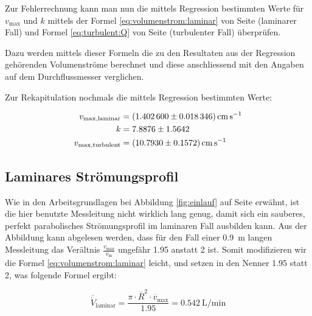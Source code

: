 Zur Fehlerrechnung kann man nun  die mittels Regression bestimmten Werte f\"ur
$v_{\mathrm{max}}$  und $k$  mittels der  Formel \ref{eq:volumenstrom:laminar}
von  Seite  \pageref{eq:volumenstrom:laminar}   (laminarer  Fall)  und  Formel
\ref{eq:turbulent:Q}  von  Seite \pageref{eq:turbulent:Q}  (turbulenter  Fall)
\"uberpr\"ufen.

Dazu werden  mittels dieser Formeln die  zu den Resultaten aus  der Regression
geh\"orenden Volumenstr\"ome berechnet und diese anschliessend mit den Angaben
auf dem Durchflussmesser verglichen.

Zur Rekapitulation nochmals die mittels Regression bestimmten Werte:

\begin{align}
    \label{eq:profile:laminar:regression:results:vmax:rekap}
    v_{\mathrm{max, laminar}} &= \SI{1.4026 \pm 0.018346}{\centi\meter\per\second}
    \\
    \label{eq:profile:turb:regression:results:k:rekap}
    k &= 7.8876 \pm 1.5642
    \\
    \label{eq:profile:turb:regression:results:vmax:rekap}
    v_{\mathrm{max, turbulent}} &= \SI{10.793 \pm 0.1572}{\centi\meter\per\second}
\end{align}

\subsection{Laminares Str\"omungsprofil}
\label{subsec:error:laminar}

Wie  in  den  Arbeitsgrundlagen  bei  Abbildung  \ref{fig:einlauf}  auf  Seite
\pageref{fig:einlauf}  erw\"ahnt,  ist  die hier  benutzte  Messleitung  nicht
wirklich  lang   genug,  damit   sich  ein  sauberes,   perfekt  parabolisches
Str\"omungsprofil  im   laminaren  Fall  ausbilden  kann. Aus   der  Abbildung
kann   abgelesen  werden,   dass   f\"ur  den   Fall  einer   \SI{0.9}{\meter}
langen  Messleitung das  Ver\"altnis $\frac{v_{\mathrm{max}}}{v_{\mathrm{m}}}$
ungef\"ahr \num{1.95}  anstatt \num{2} ist. Somit modifizieren  wir die Formel
\ref{eq:volumenstrom:laminar}  leicht, und  setzen  in  den Nenner  \num{1.95}
statt \num{2}, was folgende Formel ergibt:

\begin{equation}
    \label{eq:volumenstrom:laminar:rekap}
    \overline{\dot{V}}_{\mathrm{laminar}} = \frac{\pi \cdot \overline{R}^2 \cdot \overline{v}_{\mathrm{max}}}{1.95} = \SI{0.542}{\liter\per\minute}
\end{equation}


